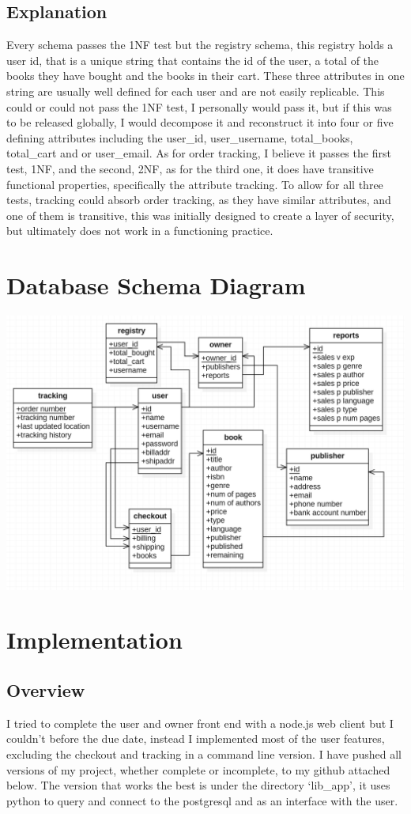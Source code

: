 \documentclass[a4 paper]{article}
\begin{document}
\subsection{Explanation}
\qquad Every schema passes the 1NF test but the registry schema, this registry holds a user id, that is a unique string that contains the id of the user, a total of the books they have bought and the books in their cart. These three attributes in one string are usually well defined for each user and are not easily replicable. This could or could not pass the 1NF test, I personally would pass it, but if this was to be released globally, I would decompose it and reconstruct it into four or five defining attributes including the user\_id, user\_username, total\_books, total\_cart and or user\_email. As for order tracking, I believe it passes the first test, 1NF, and the second, 2NF, as for the third one, it does have transitive functional properties, specifically the attribute tracking. To allow for all three tests, tracking could absorb order tracking, as they have similar attributes, and one of them is transitive, this was initially designed to create a layer of security, but ultimately does not work in a functioning practice. 
\section{Database Schema Diagram}
{\centering \includegraphics[width=\textwidth/1]{Schema_D.png}}
\section{Implementation}
\subsection{Overview}
\qquad I tried to complete the user and owner front end with a node.js web client but I couldn't before the due date, instead I implemented most of the user features, excluding the checkout and tracking in a command line version. I have pushed all versions of my project, whether complete or incomplete, to my github attached below. The version that works the best is under the directory `lib\_app', it uses python to query and connect to the postgresql and as an interface with the user. 
\end{document}
